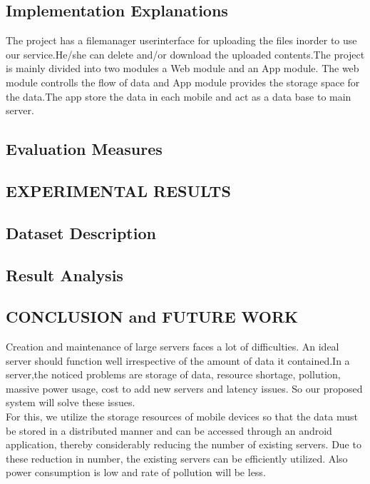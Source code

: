 \documentclass[12pt, a4paper]{article}
\begin{document}
\subsection{Implementation Explanations}
The project has a filemanager userinterface for  uploading the files inorder to use our service.He/she can delete and/or download the uploaded contents.The project is mainly divided into two modules a Web module and an App module. The web module controlls the flow of data and App module provides the storage space for the data.The app store the data in each mobile and act as a data base to main server.
\subsection{Evaluation Measures}

\newpage
\newpage
\begin{center}
\section{EXPERIMENTAL RESULTS}
\end{center}
\subsection{Dataset Description}

\subsection{Result Analysis}
\newpage
\begin{center}
\section{CONCLUSION and FUTURE WORK}
\end{center}  
   Creation and maintenance of large servers faces a lot of difficulties. An ideal server should function well irrespective of the amount of data it contained.In a server,the noticed problems are storage of data, resource shortage, pollution, massive power usage, cost to add new servers and latency issues.
So our proposed system will solve these issues.
\\

\hspace{5mm}For this, we utilize the storage resources of mobile devices so that the data must be stored in a distributed manner and can be accessed through an android application, thereby considerably reducing the number of existing servers. Due to these reduction in number, the existing servers can be efficiently utilized. Also power consumption is low and rate of pollution will be less.
 \\
 
\end{document}
